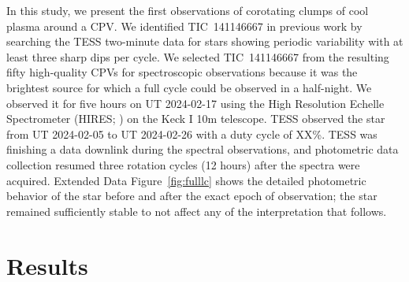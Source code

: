 \documentclass{nature3}
\begin{document}
In this study, we present the first observations of corotating clumps
of cool plasma around a CPV.  We identified TIC~141146667 in previous
work \cite{Bouma2024} by searching the TESS two-minute data for stars
showing periodic variability with at least three sharp dips per cycle.
We selected TIC~141146667 from the resulting fifty high-quality CPVs for
spectroscopic observations because it was the brightest source for
which a full cycle could be observed in a half-night.  We observed it
for five hours on UT 2024-02-17 using the High Resolution Echelle
Spectrometer (HIRES; \cite{vogt_hires_1994}) on the Keck I 10m
telescope.  TESS observed the star from UT 2024-02-05 to UT 2024-02-26
with a duty cycle of XX\%.  TESS was finishing a data downlink during
the spectral observations, and photometric data collection resumed
three rotation cycles (12 hours) after the spectra were acquired.
Extended Data Figure~\ref{fig:fulllc} shows the detailed photometric
behavior of the star before and after the exact epoch of observation;
the star remained sufficiently stable to not affect any of the
interpretation that follows.


\section{Results}
\end{document}
